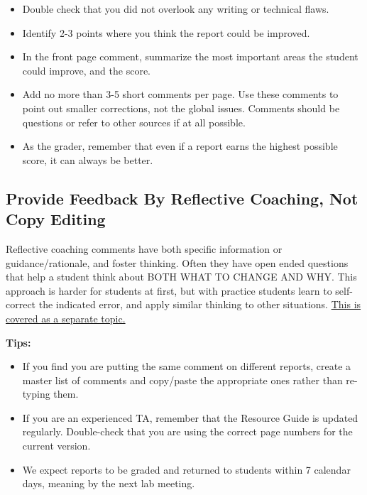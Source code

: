 \documentclass[
]{book}
\providecommand{\tightlist}{%
  \setlength{\itemsep}{0pt}\setlength{\parskip}{0pt}}
\begin{document}
\begin{itemize}
  \begin{itemize}
  \tightlist
  \item
    Double check that you did not overlook any writing or technical flaws.
  \item
    Identify 2-3 points where you think the report could be improved.
  \item
    In the front page comment, summarize the most important areas the student could improve, and the score.
  \item
    Add no more than 3-5 short comments per page. Use these comments to point out smaller corrections, not the global issues. Comments should be questions or refer to other sources if at all possible.
  \item
    As the grader, remember that even if a report earns the highest possible score, it can always be better.
  \end{itemize}
\end{itemize}

\hypertarget{provide-feedback-by-reflective-coaching-not-copy-editing}{%
\subsection{Provide Feedback By Reflective Coaching, Not Copy Editing}\label{provide-feedback-by-reflective-coaching-not-copy-editing}}

Reflective coaching comments have both specific information or guidance/rationale, and foster thinking. Often they have open ended questions that help a student think about BOTH WHAT TO CHANGE AND WHY. This approach is harder for students at first, but with practice students learn to self-correct the indicated error, and apply similar thinking to other situations. \protect\hyperlink{commenting710}{This is covered as a separate topic.}

\textbf{Tips:}

\begin{itemize}
\tightlist
\item
  If you find you are putting the same comment on different reports, create a master list of comments and copy/paste the appropriate ones rather than re-typing them.
\item
  If you are an experienced TA, remember that the Resource Guide is updated regularly. Double-check that you are using the correct page numbers for the current version.
\item
  We expect reports to be graded and returned to students within 7 calendar days, meaning by the next lab meeting.
\end{itemize}
\end{document}
